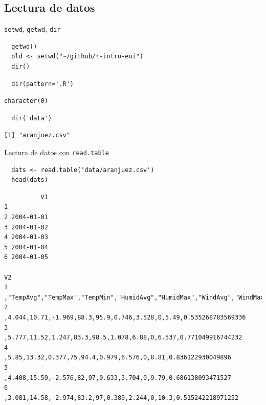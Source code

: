 \documentclass[xcolor={usenames,svgnames,dvipsnames}]{beamer}
\begin{document}
\subsection{Lectura de datos}
\label{sec-5-1}
\begin{frame}[fragile,label=sec-5-1-1]{\texttt{setwd}, \texttt{getwd}, \texttt{dir}}
 \lstset{language=R,label= ,caption= ,numbers=none}
\begin{lstlisting}
  getwd()
  old <- setwd("~/github/r-intro-eoi")
  dir()
\end{lstlisting}

\lstset{language=R,label= ,caption= ,numbers=none}
\begin{lstlisting}
  dir(pattern='.R')
\end{lstlisting}

\begin{verbatim}
character(0)
\end{verbatim}

\lstset{language=R,label= ,caption= ,numbers=none}
\begin{lstlisting}
  dir('data')
\end{lstlisting}

\begin{verbatim}
[1] "aranjuez.csv"
\end{verbatim}
\end{frame}

\begin{frame}[fragile,label=sec-5-1-2]{Lectura de datos con \texttt{read.table}}
 \lstset{language=R,label= ,caption= ,numbers=none}
\begin{lstlisting}
  dats <- read.table('data/aranjuez.csv')
  head(dats)
\end{lstlisting}

\begin{verbatim}
          V1
1           
2 2004-01-01
3 2004-01-02
4 2004-01-03
5 2004-01-04
6 2004-01-05
                                                                                                V2
1 ,"TempAvg","TempMax","TempMin","HumidAvg","HumidMax","WindAvg","WindMax","Rain","Radiation","ET"
2                               ,4.044,10.71,-1.969,88.3,95.9,0.746,3.528,0,5.49,0.535268783569336
3                                ,5.777,11.52,1.247,83.3,98.5,1.078,6.88,0,6.537,0.771049916744232
4                                   ,5.85,13.32,0.377,75,94.4,0.979,6.576,0,8.81,0.836122930049896
5                                   ,4.408,15.59,-2.576,82,97,0.633,3.704,0,9.79,0.686138093471527
6                                 ,3.081,14.58,-2.974,83.2,97,0.389,2.244,0,10.3,0.515242218971252
\end{verbatim}
\end{frame}
\end{document}
